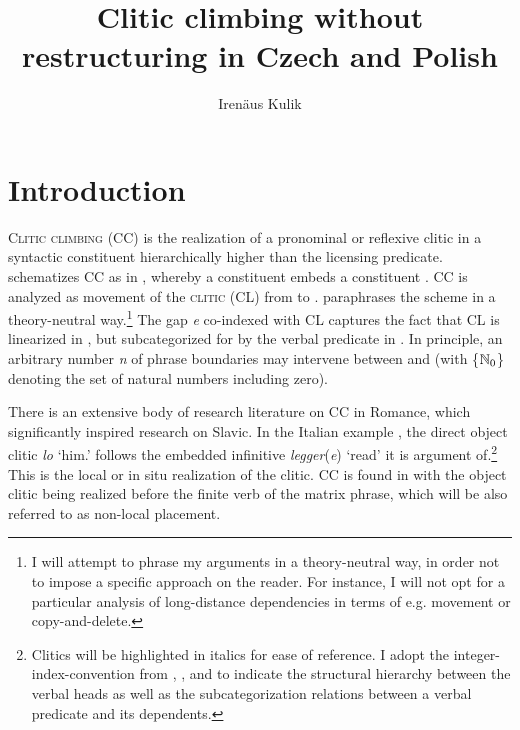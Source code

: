 \documentclass[output=paper,colorlinks,citecolor=brown]{langscibook}
\author{Irenäus Kulik\affiliation{Friedrich Schiller University Jena}\orcid{0000-0002-4178-5137}}
\title{Clitic climbing without restructuring in Czech and Polish}
\begin{document}
\maketitle

\section{Introduction}\label{kul:sec:intro}

\textsc{Clitic climbing} (CC)  is the realization of a pronominal or reflexive clitic in a syntactic constituent hierarchically higher than the licensing predicate. \citet[66]{Junghanns2002a} schematizes CC as in , whereby a constituent {\textalpha} embeds a constituent {\textbeta}. CC is analyzed as movement of the \textsc{clitic} (CL) from {\textbeta} to {\textalpha}.  paraphrases the scheme in a theory-neutral way.\footnote{I will attempt to phrase my arguments in a theory-neutral way, in order not to impose a specific approach on the reader. For instance, I will not opt for a particular analysis of long-distance dependencies in terms of e.g. movement or copy-and-delete.} The gap \textit{e} co-indexed with CL captures the fact that CL is linearized in {\textalpha}, but subcategorized for by the verbal predicate in {\textbeta}. In principle, an arbitrary number \textit{n} of phrase boundaries may intervene between {\textalpha} and {\textbeta} (with \{$\mathbb{N}\textsubscript{0}$\} denoting the set of natural numbers including zero).

\ea\label{kul:ex:alphabeta}
\label{kul:ex:alphabeta-a}

\label{kul:ex:alphabeta-b}
\z
\z

\noindent There is an extensive body of research literature on CC in Romance, which signi\-ficantly inspired research on Slavic. In the Italian example , the direct object clitic \textit{lo} `him.{\ACC}' follows the embedded infinitive \textit{legger}(\textit{e}) ‘read’ it is argument of.\footnote{Clitics will be highlighted in italics for ease of reference. I adopt the integer-index-convention from \citet{Hana2007}, \citet{Rosen2014}, and \citet{KolakovicFritz2022} to indicate the structural hierarchy between the verbal heads as well as the subcategorization relations between a verbal predicate and its dependents.} This is the local or in situ realization of the clitic. CC is found in  with the object clitic being realized before the finite verb of the matrix phrase, which will be also referred to as non-local placement.
\end{document}
